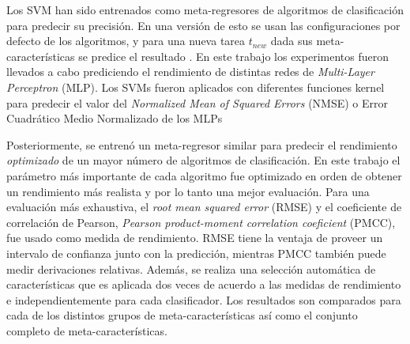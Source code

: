 Los SVM han sido entrenados como meta-regresores de algoritmos de clasificación para predecir su precisión. En una versión de esto se usan las configuraciones por defecto de los algoritmos, y para una nueva tarea $t_{new}$ dada sus meta-características se predice el resultado \cite{guerra2008predicting}. En este trabajo los experimentos fueron llevados a cabo prediciendo el rendimiento de distintas redes de \textit{Multi-Layer Perceptron} (MLP). Los SVMs fueron aplicados con diferentes funciones kernel para predecir el valor del \textit{Normalized Mean of Squared Errors} (NMSE) o Error Cuadrático Medio Normalizado de los MLPs

Posteriormente, se entrenó un meta-regresor similar \cite{reif2012automatic} para predecir el rendimiento \textit{optimizado} de un mayor número de algoritmos de clasificación. En este trabajo el parámetro más importante de cada algoritmo fue optimizado en orden de obtener un rendimiento más realista y por lo tanto una mejor evaluación. Para una evaluación más exhaustiva, el \textit{root mean squared error} (RMSE) y el coeficiente de correlación de Pearson, \textit{Pearson product-moment correlation coeficient} (PMCC), fue usado como medida de rendimiento. RMSE tiene la ventaja de proveer un intervalo de confianza junto con la predicción, mientras PMCC también puede medir derivaciones relativas. Además, se realiza una selección automática de características que es aplicada dos veces de acuerdo a las medidas de rendimiento e independientemente para cada clasificador. Los resultados son comparados para cada de los distintos grupos de meta-características así como el conjunto completo de meta-características.

%
%
%
%

